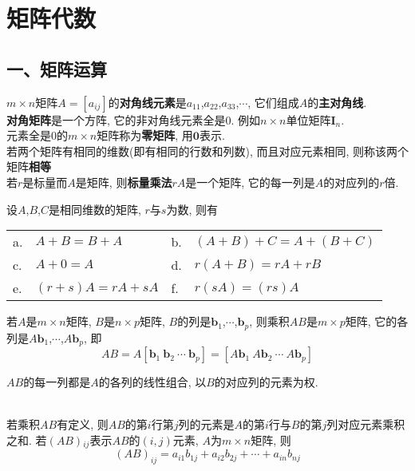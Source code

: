 \chapter{矩阵代数}
\section{一、矩阵运算}
$m\times n$矩阵$A=[a_{ij}]$的\textbf{对角线元素}是$a_{11}$,$a_{22}$,$a_{33}$,$\cdots$, 它们组成$A$的\textbf{主对角线}.\\[1ex]
\textbf{对角矩阵}是一个方阵, 它的非对角线元素全是0. 例如$n\times n$单位矩阵$\bm{I}_n$.\\[1ex]
元素全是0的$m\times n$矩阵称为\textbf{零矩阵}, 用$\bm{0}$表示.\\[1ex]
若两个矩阵有相同的维数(即有相同的行数和列数), 而且对应元素相同, 则称该两个矩阵\textbf{相等}\\[1ex]
若$r$是标量而$A$是矩阵, 则\textbf{标量乘法}$rA$是一个矩阵, 它的每一列是$A$的对应列的$r$倍.\\[2ex]

\begin{theorem}
设$A$,$B$,$C$是相同维数的矩阵, $r$与$s$为数, 则有\\
\begin{tabular}{l@{\ }l@{\hspace{5em}}l@{\ }l}
a. & $A+B=B+A$ & b. & $(A+B)+C=A+(B+C)$\\
c. & $A+0=A$ & d. & $r(A+B)=rA+rB$\\
e. & $(r+s)A=rA+sA$ & f. & $r(sA)=(rs)A$
\end{tabular}
\end{theorem}\vspace{4ex}

\begin{definition}
若$A$是$m\times n$矩阵, $B$是$n\times p$矩阵, $B$的列是$\bm{b}_1$,$\cdots$,$\bm{b}_p$, 则乘积$AB$是$m\times p$矩阵, 它的各列是$A\bm{b}_1$,$\cdots$,$A\bm{b}_p$, 即
\[AB=A[\bm{b}_1\ \bm{b}_2\ \cdots\ \bm{b}_p]=[A\bm{b}_1\ A\bm{b}_2\ \cdots\ A\bm{b}_p]\]
\end{definition}\vspace{4ex}

\begin{law}
$AB$的每一列都是$A$的各列的线性组合, 以$B$的对应列的元素为权.
\end{law}\vspace{4ex}

\begin{law}[计算$AB$的行列法则]\ \\
若乘积$AB$有定义, 则$AB$的第$i$行第$j$列的元素是$A$的第$i$行与$B$的第$j$列对应元素乘积之和. 若$(AB)$${}_{ij}$表示$AB$的$(i,j)$元素, $A$为$m\times n$矩阵, 则
\[(AB)_{ij}=a_{i1}b_{1j}+a_{i2}b_{2j}+\cdots+a_{in}b_{nj}\]
\end{law}\vspace{4ex}

